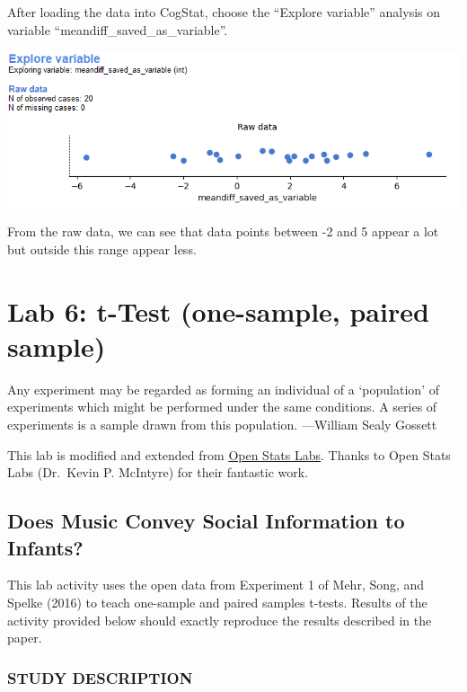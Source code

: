 \documentclass[
]{book}
\begin{document}
After loading the data into CogStat, choose the ``Explore variable'' analysis on variable ``meandiff\_saved\_as\_variable''.

\includegraphics{img/ch5/5.4rawdata.png}

From the raw data, we can see that data points between -2 and 5 appear a lot but outside this range appear less.

\hypertarget{lab-6-t-test-one-sample-paired-sample}{%
\chapter{Lab 6: t-Test (one-sample, paired sample)}\label{lab-6-t-test-one-sample-paired-sample}}

{
Any experiment may be regarded as forming an individual of a `population' of experiments which might be performed under the same conditions. A series of experiments is a sample drawn from this population.
---William Sealy Gossett
}

This lab is modified and extended from \href{https://sites.trinity.edu/osl}{Open Stats Labs}. Thanks to Open Stats Labs (Dr.~Kevin P. McIntyre) for their fantastic work.

\hypertarget{does-music-convey-social-information-to-infants}{%
\section{Does Music Convey Social Information to Infants?}\label{does-music-convey-social-information-to-infants}}

This lab activity uses the open data from Experiment 1 of Mehr, Song, and Spelke (2016) to teach one-sample and paired samples t-tests. Results of the activity provided below should exactly reproduce the results described in the paper.

\hypertarget{study-description}{%
\subsection{STUDY DESCRIPTION}\label{study-description}}
\end{document}
